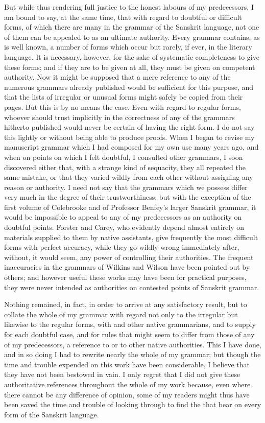 But while thus rendering full justice to the honest labours of my
predecessors, I am bound to say, at the same time, that with regard to
doubtful or difficult forms, of which there are many in the grammar of
the Sanskrit language, not one of them can be appealed to as an ultimate
authority. Every grammar contains, as is well known, a number of forms
which occur but rarely, if ever, in the literary language. It is
necessary, however, for the sake of systematic completeness to give
these forms; and if they are to be given at all, they must be given on
competent authority. Now it might be supposed that a mere reference to
any of the numerous grammars already published would be sufficient for
this purpose, and that the lists of irregular or unusual forms might
safely be copied from their pages. But this is by no means the case.
Even with regard to regular forms, whoever should trust implicitly in
the correctness of any of the grammars hitherto published would never be
certain of having the right form. I do not say this lightly or without
being able to produce proofs. When I began to revise my manuscript
grammar which I had composed for my own use many years ago, and when on
points on which I felt doubtful, I consulted other grammars, I soon
discovered either that, with a strange kind of sequacity, they all
repeated the same mistake, or that they varied wildly from each other
without assigning any reason or authority. I need not say that the
grammars which we possess differ very much in the degree of their
trustworthiness; but with the exception of the first volume of
Colebrooke and of Professor Benfey's larger Sanskrit grammar, it would
be impossible to appeal to any of my predecessors as an authority on
doubtful points. Forster and Carey, who evidently depend almost entirely
on materials supplied to them by native assistants, give frequently the
most difficult forms with perfect accuracy, while they go wildly wrong
immediately after, without, it would seem, any power of controlling
their authorities. The frequent inaccuracies in the grammars of Wilkins
and Wilson have been pointed out by others; and however useful these
works may have been for practical purposes, they were never intended as
authorities on contested points of Sanskrit grammar.

Nothing remained, in fact, in order to arrive at any satisfactory
result, but to collate the whole of my grammar with regard not only to
the irregular but likewise to the regular forms, with \panini{} and
other native grammarians, and to supply for each doubtful case, and for
rules that might seem to differ from those of any of my predecessors, a
reference to \panini{} or to other native authorities. This I have done,
and in so doing I had to rewrite nearly the whole of my grammar; but
though the time and trouble expended on this work have been
considerable, I believe that they have not been bestowed in vain. I only
regret that I did not give these authoritative references throughout the
whole of my work because, even where there cannot be any difference of
opinion, some of my readers might thus have been saved the time and
trouble of looking through \panini{} to find the  that bear
on every form of the Sanskrit language.

